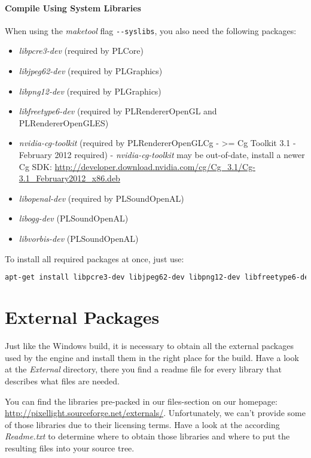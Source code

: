 \paragraph{Compile Using System Libraries}
When using the \emph{maketool} flag \verb+--syslibs+, you also need the following packages:
\begin{itemize}
\item{\emph{libpcre3-dev} (required by PLCore)}
\item{\emph{libjpeg62-dev} (required by PLGraphics)}
\item{\emph{libpng12-dev} (required by PLGraphics)}
\item{\emph{libfreetype6-dev} (required by PLRendererOpenGL and PLRendererOpenGLES)}
\item{\emph{nvidia-cg-toolkit} (required by PLRendererOpenGLCg - >= Cg Toolkit 3.1 - February 2012 required) - \emph{nvidia-cg-toolkit} may be out-of-date, install a newer Cg \ac{SDK}: \url{http://developer.download.nvidia.com/cg/Cg_3.1/Cg-3.1_February2012_x86.deb}}
\item{\emph{libopenal-dev} (required by PLSoundOpenAL)}
\item{\emph{libogg-dev} (PLSoundOpenAL)}
\item{\emph{libvorbis-dev} (PLSoundOpenAL)}
\end{itemize}

To install all required packages at once, just use:
\begin{lstlisting}[language=sh]
apt-get install libpcre3-dev libjpeg62-dev libpng12-dev libfreetype6-dev libopenal-dev libogg-dev libvorbis-dev
\end{lstlisting}




\section{External Packages}
\label{Chapter:Linux_ExternalPackages}
Just like the Windows build, it is necessary to obtain all the external packages used by the engine and install them in the right place for the build. Have a look at the \emph{External} directory, there you find a readme file for every library that describes what files are needed.

You can find the libraries pre-packed in our files-section on our homepage: \url{http://pixellight.sourceforge.net/externals/}. Unfortunately, we can't provide some of those libraries due to their licensing terms. Have a look at the according \emph{Readme.txt} to determine where to obtain those libraries and where to put the resulting files into your source tree.

